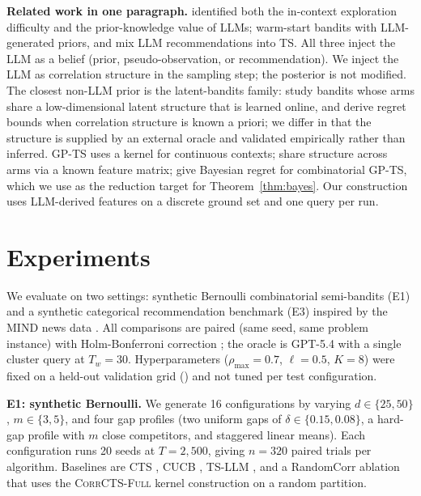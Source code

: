 \documentclass{article}
\theoremstyle{plain}
\theoremstyle{definition}
\theoremstyle{remark}
\newcommand{\CorrFull}{\textsc{CorrCTS-Full}}
\begin{document}
\textbf{Related work in one paragraph.}
\citet{krishnamurthy2024canllms} identified both the in-context exploration difficulty and the prior-knowledge value of LLMs; \citet{alamdari2024jumpstarting,bayley2025jumpstart} warm-start bandits with LLM-generated priors, and \citet{sun2025tsllm} mix LLM recommendations into TS.
All three inject the LLM as a belief (prior, pseudo-observation, or recommendation).
We inject the LLM as correlation structure in the sampling step; the posterior is not modified.
The closest non-LLM prior is the latent-bandits family: \citet{hong2020latent} study bandits whose arms share a low-dimensional latent structure that is learned online, and \citet{gupta2021correlated} derive regret bounds when correlation structure is known a priori; we differ in that the structure is supplied by an external oracle and validated empirically rather than inferred.
GP-TS \citep{srinivas2010gpucb} uses a kernel for continuous contexts; \citet{kveton2023mixed} share structure across arms via a known feature matrix; \citet{sandberg2025bayesian} give Bayesian regret for combinatorial GP-TS, which we use as the reduction target for Theorem~\ref{thm:bayes}.
Our construction uses LLM-derived features on a discrete ground set and one query per run.

\section{Experiments}\label{sec:exp}

We evaluate on two settings: synthetic Bernoulli combinatorial semi-bandits (E1) and a synthetic categorical recommendation benchmark (E3) inspired by the MIND news data \citep{wu2020mind}.
All comparisons are paired (same seed, same problem instance) with Holm-Bonferroni correction \citep{holm1979simple}; the oracle is GPT-5.4 with a single cluster query at $T_w = 30$.
Hyperparameters ($\rho_{\max} = 0.7$, $\ell = 0.5$, $K = 8$) were fixed on a held-out validation grid () and not tuned per test configuration.

\textbf{E1: synthetic Bernoulli.}
We generate 16 configurations by varying $d \in \{25, 50\}$, $m \in \{3, 5\}$, and four gap profiles (two uniform gaps of $\delta \in \{0.15, 0.08\}$, a hard-gap profile with $m$ close competitors, and staggered linear means).
Each configuration runs 20 seeds at $T = 2{,}500$, giving $n = 320$ paired trials per algorithm.
Baselines are CTS \citep{wang2018cts}, CUCB \citep{chen2013cucb}, TS-LLM \citep{sun2025tsllm}, and a RandomCorr ablation that uses the \CorrFull{} kernel construction on a random partition.
\end{document}
